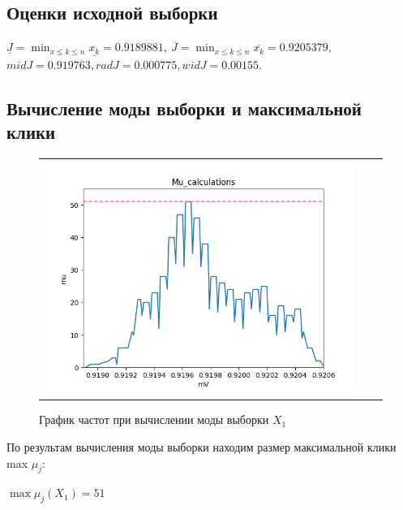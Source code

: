 \documentclass[a4paper,14pt]{article}
\begin{document}
	\subsection{Оценки исходной выборки}
	\begin{center}
		$\underline{J} = \min_{x \leq k \leq n} \underline{x_k} = 0.9189881, \ \overline{J} = \min_{x \leq k \leq n} \overline{x_k} =  0.9205379,$\\
		$mid J = 0.919763, rad J = 0.000775, wid J = 0.00155.$
	\end{center}
	
	\subsection{Вычисление моды выборки и максимальной клики}
	\begin{figure}[H]
		\begin{center}
			\begin{tabular}{ccc}
				\includegraphics[scale=0.7]{../image/input_mu.png}
			\end{tabular}
		\end{center}
		\caption{График частот при вычислении моды выборки $X_1$} 
	\end{figure}

	По результам вычисления моды выборки находим размер максимальной клики max $\mu_j$:
	\begin{center}
		$\max\mu_j (X_1) = 51$
	\end{center}
	
\end{document}

